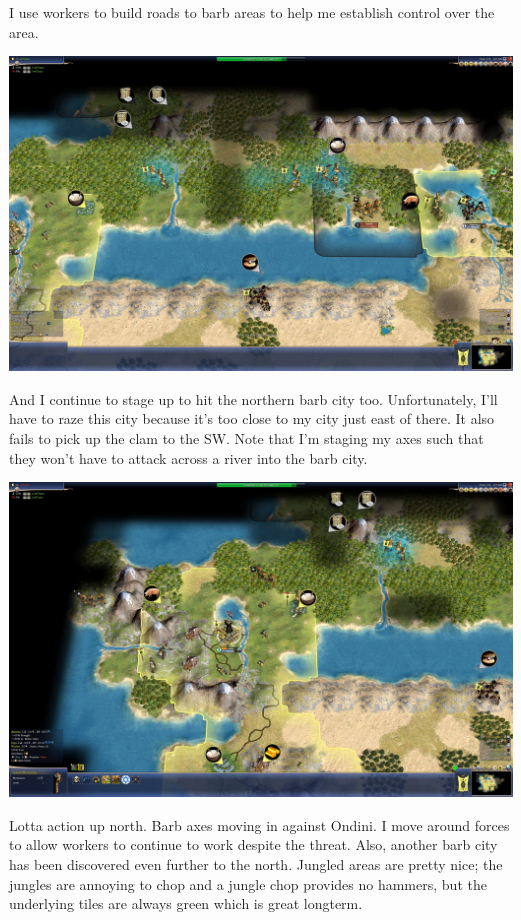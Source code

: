 \documentclass[10pt]{article}
\begin{document}
I use workers to build roads to barb areas to help me establish control over the area.

\includegraphics[width=1.0\textwidth]{94}

And I continue to stage up to hit the northern barb city too. Unfortunately, I'll have to raze this city because
it's too close to my city just east of there. It also fails to pick up the clam to the SW. Note that I'm staging my
axes such that they won't have to attack across a river into the barb city.

\includegraphics[width=1.0\textwidth]{96}

Lotta action up north. Barb axes moving in against Ondini. I move around forces to allow workers to continue to work
despite the threat. Also, another barb city has been discovered even further to the north. Jungled areas are pretty nice;
the jungles are annoying to chop and a jungle chop provides no hammers, but the underlying tiles are always green which
is great longterm.
\end{document}
